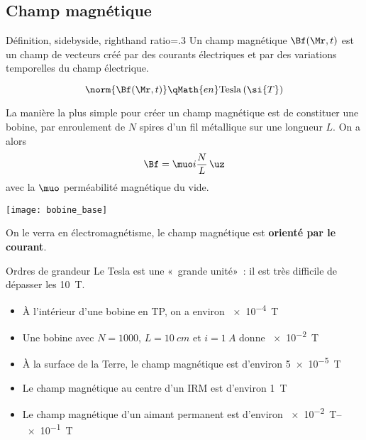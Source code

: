 \documentclass[../main/main.tex]{subfiles}
\begin{document}
\subsection{Champ magnétique}
\begin{tdefi}{Définition, sidebyside, righthand ratio=.3}
    Un champ magnétique $\Bf(\Mr,t)$ est un champ de vecteurs créé par des
    courants électriques et par des variations temporelles du champ électrique.
    \tcblower
    \begin{center}
        \bfseries\color{deficol}
    \end{center}
    \[\norm{\Bf(\Mr,t)} \qMath{en} \mathrm{Tesla} \,(\si{T})\]
\end{tdefi}

\begin{minipage}{0.65\linewidth}
    La manière la plus simple pour créer un champ magnétique est de constituer
    une bobine, par enroulement de $N$ spires d'un fil métallique sur une
    longueur $L$. On a alors
    \[\Bf = \muo i\frac{N}{L}\,\uz\]
    avec la $\muo$ perméabilité magnétique du vide. \bigbreak
\end{minipage}
\hfill
\begin{minipage}{0.33\linewidth}
    \begin{center}
        \texttt{[image: bobine\_base]}
        \captionsetup{justification=centering}
        \label{fig:bobine}
    \end{center}
\end{minipage}
On le verra en électromagnétisme, le champ magnétique est \textbf{orienté
par le courant}.

\begin{rexem}{Ordres de grandeur}
    Le Tesla est une «~grande unité»~: il est très difficile de dépasser les
    \SI{10}{T}.
    \begin{itemize}[label=$\diamond$]
        \item À l'intérieur d'une bobine en TP, on a environ
            \SI{e-4}{T}
        \item Une bobine avec $N = \num{1000}$, $L = \SI{10}{cm}$ et $i =
            \SI{1}{A}$ donne \SI{e-2}{T}
        \item À la surface de la Terre, le champ magnétique est d'environ
            \SI{5e-5}{T}
        \item Le champ magnétique au centre d'un IRM est d'environ
            \SI{1}{T}
        \item Le champ magnétique d'un aimant permanent est d'environ
            \SIrange{e-2}{e-1}{T}
    \end{itemize}
\end{rexem}
\end{document}
